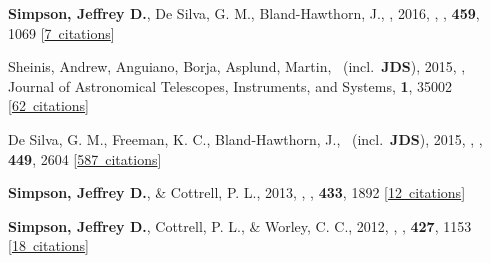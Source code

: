 \item[{\color{numcolor}\scriptsize5}] \textbf{Simpson, Jeffrey D.}, De Silva, G. M., Bland-Hawthorn, J., \etal, 2016, , \mnras, \textbf{459}, 1069 [\href{https://ui.adsabs.harvard.edu/#abs/2016MNRAS.459.1069S}{7~citations}]

\item[{\color{numcolor}\scriptsize4}] Sheinis, Andrew, Anguiano, Borja, Asplund, Martin, \etal\ (incl.\ \textbf{JDS}), 2015, , Journal of Astronomical Telescopes, Instruments, and Systems, \textbf{1}, 35002 [\href{https://ui.adsabs.harvard.edu/#abs/2015JATIS...1c5002S}{62~citations}]

\item[{\color{numcolor}\scriptsize3}] De Silva, G. M., Freeman, K. C., Bland-Hawthorn, J., \etal\ (incl.\ \textbf{JDS}), 2015, , \mnras, \textbf{449}, 2604 [\href{https://ui.adsabs.harvard.edu/#abs/2015MNRAS.449.2604D}{587~citations}]

\item[{\color{numcolor}\scriptsize2}] \textbf{Simpson, Jeffrey D.}, \& Cottrell, P. L., 2013, , \mnras, \textbf{433}, 1892 [\href{https://ui.adsabs.harvard.edu/#abs/2013MNRAS.433.1892S}{12~citations}]

\item[{\color{numcolor}\scriptsize1}] \textbf{Simpson, Jeffrey D.}, Cottrell, P. L., \& Worley, C. C., 2012, , \mnras, \textbf{427}, 1153 [\href{https://ui.adsabs.harvard.edu/#abs/2012MNRAS.427.1153S}{18~citations}]